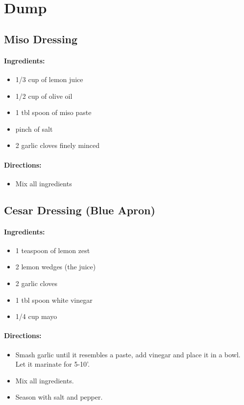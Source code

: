 \documentclass{article}
\begin{document}
\section{Dump}

\subsection{Miso Dressing}

\paragraph{Ingredients:}

\begin{itemize}
	\item 1/3 cup of lemon juice
	\item 1/2 cup of olive oil
	\item 1 tbl spoon of miso paste
	\item pinch of salt
	\item 2 garlic cloves finely minced
\end{itemize}

\paragraph{Directions:}
\begin{itemize}
	\item Mix all ingredients
\end{itemize}

\subsection{Cesar Dressing (Blue Apron)}

\paragraph{Ingredients:}

\begin{itemize}
	\item 1 teaspoon of lemon zest
	\item 2 lemon wedges (the juice)
	\item 2 garlic cloves
	\item 1 tbl spoon white vinegar
	\item 1/4 cup mayo
\end{itemize}

\paragraph{Directions:}
\begin{itemize}
	\item Smash garlic until it resembles a paste, add vinegar and place it in a bowl. Let it marinate for 5-10'. 
	\item Mix all ingredients.
	\item Season with salt and pepper.
\end{itemize}
\end{document}
